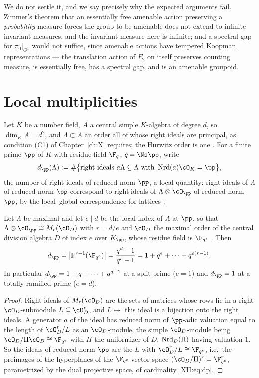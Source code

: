 \begin{summary}
We do not settle it, and we say precisely why the expected arguments fail. Zimmer's theorem
that an essentially free amenable action preserving a \emph{probability} measure forces the
group to be amenable does not extend to infinite invariant measures, and the invariant
measure here is infinite; and a spectral gap for $\pi_0|_{G^1}$ would not suffice, since
amenable actions have tempered Koopman representations --- the translation action of $F_2$
on itself preserves counting measure, is essentially free, has a spectral gap, and is an
amenable groupoid.
\end{summary}


\section{Local multiplicities}

Let $K$ be a number field, $A$ a central simple $K$-algebra of degree $d$, so
$\dim_KA=d^2$, and $\Lambda\subset A$ an order all of whose right ideals are principal, as
condition (C1) of Chapter~\ref{ch:X} requires; the Hurwitz order is one \cite{Reiner,Vigneras}. For a
finite prime $\pp$ of $K$ with residue field $\F_q$, $q=\Ns\pp$, write
\[
d_\pp(\Lambda):=\#\bigl\{\text{right ideals }a\Lambda\subseteq\Lambda\text{ with }\Nrd(a)\cO_K=\pp\bigr\},
\]
the number of right ideals of reduced norm $\pp$, a local quantity: right ideals of
$\Lambda$ of reduced norm $\pp$ correspond to right ideals of $\Lambda\otimes\cO_\pp$ of
reduced norm $\pp$, by the local--global correspondence for lattices \cite{Reiner}.

\begin{lemma}\label{XII:lem:split}
Let $\Lambda$ be maximal and let $e\mid d$ be the local index of $A$ at $\pp$, so that
$\Lambda\otimes\cO_\pp\cong M_{r}(\cO_D)$ with $r=d/e$ and $\cO_D$ the maximal order of the
central division algebra $D$ of index $e$ over $K_\pp$, whose residue field is $\F_{q^e}$
\cite[Ch.~3]{Reiner}. Then
\begin{equation}\label{XII:eq:dp}
d_\pp=\bigl|\mathbb P^{r-1}(\F_{q^e})\bigr|=\frac{q^{d}-1}{q^{e}-1}=1+q^e+\cdots+q^{e(r-1)} .
\end{equation}
In particular $d_\pp=1+q+\cdots+q^{d-1}$ at a split prime ($e=1$) and $d_\pp=1$ at a totally
ramified prime ($e=d$).
\end{lemma}

\begin{proof}
Right ideals of $M_r(\cO_D)$ are the sets of matrices whose rows lie in a right
$\cO_D$-submodule $L\subseteq\cO_D^r$, and $L\mapsto$ this ideal is a bijection onto the
right ideals. A generator $a$ of the ideal has reduced norm of $\pp$-adic valuation equal
to the length of $\cO_D^r/L$ as an $\cO_D$-module, the simple $\cO_D$-module being
$\cO_D/\Pi\cO_D\cong\F_{q^e}$ with $\Pi$ the uniformizer of $D$, $\operatorname{Nrd}_D(\Pi)$ having
valuation $1$. So the ideals of reduced norm $\pp$ are the $L$ with $\cO_D^r/L\cong\F_{q^e}$,
i.e.\ the preimages of the hyperplanes of the $\F_{q^e}$-vector space
$(\cO_D/\Pi)^r=\F_{q^e}^r$, parametrized by the dual projective space, of cardinality
\eqref{XII:eq:dp}.
\end{proof}

